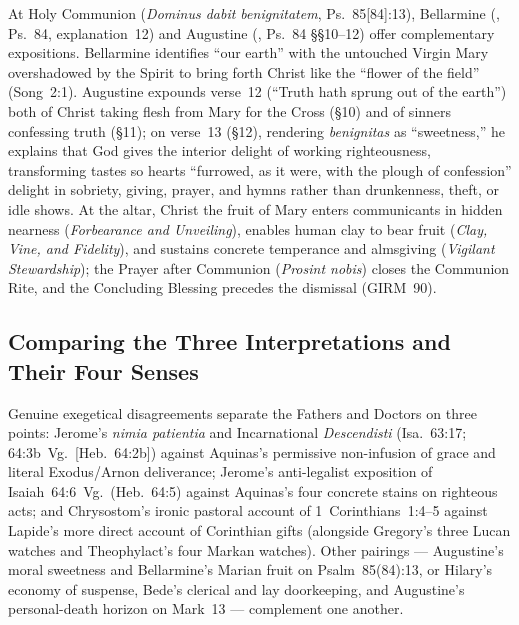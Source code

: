 At Holy Communion (\emph{Dominus dabit benignitatem}, Ps.~85[84]:13), Bellarmine (, Ps.~84, explanation~12) and Augustine (, Ps.~84 §§10--12) offer complementary expositions. Bellarmine identifies ``our earth'' with the untouched Virgin Mary overshadowed by the Spirit to bring forth Christ like the ``flower of the field'' (Song~2:1). Augustine expounds verse~12 (``Truth hath sprung out of the earth'') both of Christ taking flesh from Mary for the Cross (§10) and of sinners confessing truth (§11); on verse~13 (§12), rendering \emph{benignitas} as ``sweetness,'' he explains that God gives the interior delight of working righteousness, transforming tastes so hearts ``furrowed, as it were, with the plough of confession'' delight in sobriety, giving, prayer, and hymns rather than drunkenness, theft, or idle shows. At the altar, Christ the fruit of Mary enters communicants in hidden nearness (\emph{Forbearance and Unveiling}), enables human clay to bear fruit (\emph{Clay, Vine, and Fidelity}), and sustains concrete temperance and almsgiving (\emph{Vigilant Stewardship}); the Prayer after Communion (\emph{Prosint nobis}) closes the Communion Rite, and the Concluding Blessing precedes the dismissal (GIRM~90).

\subsection{Comparing the Three Interpretations and Their Four Senses}

Genuine exegetical disagreements separate the Fathers and Doctors on three points: Jerome's \emph{nimia patientia} and Incarnational \emph{Descendisti} (Isa.~63:17; 64:3b~Vg.\ [Heb.~64:2b]) against Aquinas's permissive non-infusion of grace and literal Exodus/Arnon deliverance; Jerome's anti-legalist exposition of Isaiah~64:6~Vg.\ (Heb.~64:5) against Aquinas's four concrete stains on righteous acts; and Chrysostom's ironic pastoral account of 1~Corinthians~1:4--5 against Lapide's more direct account of Corinthian gifts (alongside Gregory's three Lucan watches and Theophylact's four Markan watches). Other pairings --- Augustine's moral sweetness and Bellarmine's Marian fruit on Psalm~85(84):13, or Hilary's economy of suspense, Bede's clerical and lay doorkeeping, and Augustine's personal-death horizon on Mark~13 --- complement one another.

